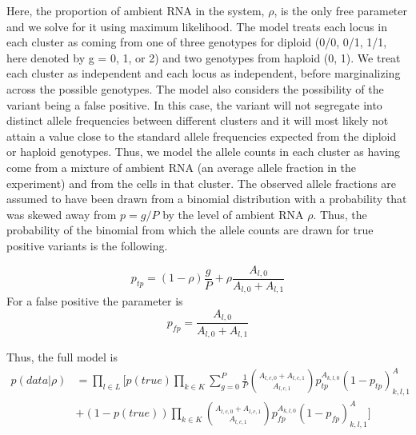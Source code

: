Here, the proportion of ambient RNA in the system, $\rho$, is the only free parameter and we solve for it using maximum likelihood. The model treats each locus in each cluster as coming from one of three genotypes for diploid (0/0, 0/1, 1/1, here denoted by g = 0, 1, or 2) and two genotypes from haploid (0, 1). We treat each cluster as independent and each locus as independent, before marginalizing across the possible genotypes. The model also considers the possibility of the variant being a false positive. In this case, the variant will not segregate into distinct allele frequencies between different clusters and it will most likely not attain a value close to the standard allele frequencies expected from the diploid or haploid genotypes. Thus, we model the allele counts in each cluster as having come from a mixture of ambient RNA (an average allele fraction in the experiment) and from the cells in that cluster. The observed allele fractions are assumed to have been drawn from a binomial distribution with a probability that was skewed away from $p = g/P$ by the level of ambient RNA $\rho$. Thus, the probability of the binomial from which the allele counts are drawn for true positive variants is the following.



\begin{equation}
p_{tp} = (1-\rho)\frac{g}{P} + \rho \frac{A_{l,0}}{A_{l,0}+A_{l,1}}
\end{equation}
For a false positive the parameter is
\begin{equation}
p_{fp} = \frac{A_{l,0}}{A_{l,0} + A_{l,1}}
\end{equation}

Thus, the full model is
\begin{equation}
\begin{split}
p(data | \rho)  &= \prod_{l \in L} \bigg[p(true) \prod_{k \in K} \sum^P_{g=0} \frac{1}{P}  {A_{l,c,0} + A_{l,c,1}  \choose A_{l,c,1}} p_{tp}^{A_{k,l,0}} (1-p_{tp})^A_{k,l,1}  \\ &+ (1-p(true)) \prod_{k \in K} {A_{l,c,0} + A_{l,c,1}  \choose A_{l,c,1}} p_{fp}^{A_{k,l,0}} (1-p_{fp})^A_{k,l,1} \bigg]
\end{split}
\end{equation}



